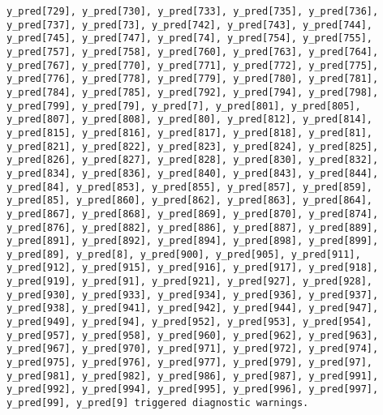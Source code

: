 \documentclass[
  letterpaper,
  DIV=11,
  numbers=noendperiod]{scrartcl}
\begin{document}
\begin{verbatim}
y_pred[729], y_pred[730], y_pred[733], y_pred[735], y_pred[736],
y_pred[737], y_pred[73], y_pred[742], y_pred[743], y_pred[744],
y_pred[745], y_pred[747], y_pred[74], y_pred[754], y_pred[755],
y_pred[757], y_pred[758], y_pred[760], y_pred[763], y_pred[764],
y_pred[767], y_pred[770], y_pred[771], y_pred[772], y_pred[775],
y_pred[776], y_pred[778], y_pred[779], y_pred[780], y_pred[781],
y_pred[784], y_pred[785], y_pred[792], y_pred[794], y_pred[798],
y_pred[799], y_pred[79], y_pred[7], y_pred[801], y_pred[805],
y_pred[807], y_pred[808], y_pred[80], y_pred[812], y_pred[814],
y_pred[815], y_pred[816], y_pred[817], y_pred[818], y_pred[81],
y_pred[821], y_pred[822], y_pred[823], y_pred[824], y_pred[825],
y_pred[826], y_pred[827], y_pred[828], y_pred[830], y_pred[832],
y_pred[834], y_pred[836], y_pred[840], y_pred[843], y_pred[844],
y_pred[84], y_pred[853], y_pred[855], y_pred[857], y_pred[859],
y_pred[85], y_pred[860], y_pred[862], y_pred[863], y_pred[864],
y_pred[867], y_pred[868], y_pred[869], y_pred[870], y_pred[874],
y_pred[876], y_pred[882], y_pred[886], y_pred[887], y_pred[889],
y_pred[891], y_pred[892], y_pred[894], y_pred[898], y_pred[899],
y_pred[89], y_pred[8], y_pred[900], y_pred[905], y_pred[911],
y_pred[912], y_pred[915], y_pred[916], y_pred[917], y_pred[918],
y_pred[919], y_pred[91], y_pred[921], y_pred[927], y_pred[928],
y_pred[930], y_pred[933], y_pred[934], y_pred[936], y_pred[937],
y_pred[938], y_pred[941], y_pred[942], y_pred[944], y_pred[947],
y_pred[949], y_pred[94], y_pred[952], y_pred[953], y_pred[954],
y_pred[957], y_pred[958], y_pred[960], y_pred[962], y_pred[963],
y_pred[967], y_pred[970], y_pred[971], y_pred[972], y_pred[974],
y_pred[975], y_pred[976], y_pred[977], y_pred[979], y_pred[97],
y_pred[981], y_pred[982], y_pred[986], y_pred[987], y_pred[991],
y_pred[992], y_pred[994], y_pred[995], y_pred[996], y_pred[997],
y_pred[99], y_pred[9] triggered diagnostic warnings.
 

\end{verbatim}
\end{document}
